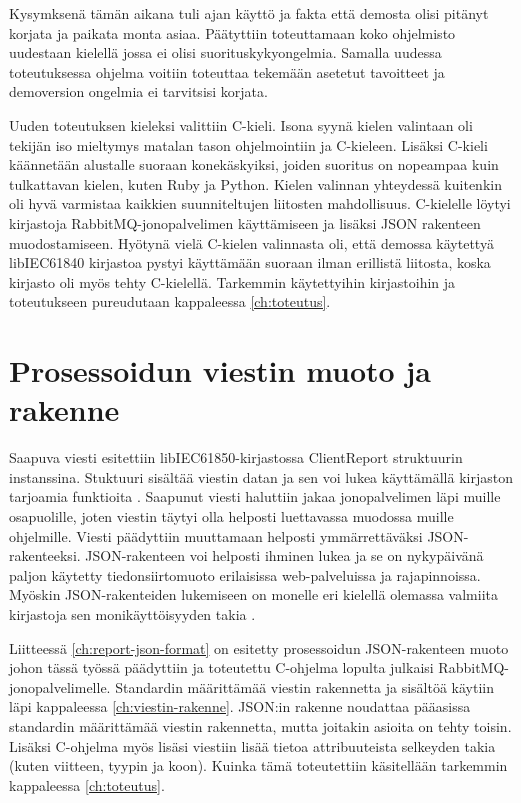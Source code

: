 Kysymksenä tämän aikana tuli ajan käyttö ja fakta että demosta olisi pitänyt korjata ja paikata monta asiaa. Päätyttiin toteuttamaan koko ohjelmisto uudestaan kielellä jossa ei olisi suorituskykyongelmia. Samalla uudessa toteutuksessa ohjelma voitiin toteuttaa tekemään asetetut tavoitteet ja demoversion ongelmia ei tarvitsisi korjata.

Uuden toteutuksen kieleksi valittiin C-kieli. Isona syynä kielen valintaan oli tekijän iso mieltymys matalan tason ohjelmointiin ja C-kieleen. Lisäksi C-kieli käännetään alustalle suoraan konekäskyiksi, joiden suoritus on nopeampaa kuin tulkattavan kielen, kuten Ruby ja Python. Kielen valinnan yhteydessä kuitenkin oli hyvä varmistaa kaikkien suunniteltujen liitosten mahdollisuus. C-kielelle löytyi kirjastoja RabbitMQ-jonopalvelimen käyttämiseen ja lisäksi JSON rakenteen muodostamiseen. Hyötynä vielä C-kielen valinnasta oli, että demossa käytettyä libIEC61840 kirjastoa pystyi käyttämään suoraan ilman erillistä liitosta, koska kirjasto oli myös tehty C-kielellä. Tarkemmin käytettyihin kirjastoihin ja toteutukseen pureudutaan kappaleessa \ref{ch:toteutus}.


\section{Prosessoidun viestin muoto ja rakenne}
Saapuva viesti esitettiin libIEC61850-kirjastossa ClientReport struktuurin instanssina. Stuktuuri sisältää viestin datan ja sen voi lukea käyttämällä kirjaston tarjoamia funktioita \cite{libIEC61850-doc}. Saapunut viesti haluttiin jakaa jonopalvelimen läpi muille osapuolille, joten viestin täytyi olla helposti luettavassa muodossa muille ohjelmille. Viesti päädyttiin muuttamaan helposti ymmärrettäväksi JSON-rakenteeksi. JSON-rakenteen voi helposti ihminen lukea ja se on nykypäivänä paljon käytetty tiedonsiirtomuoto erilaisissa web-palveluissa ja rajapinnoissa. Myöskin JSON-rakenteiden lukemiseen on monelle eri kielellä olemassa valmiita kirjastoja sen monikäyttöisyyden takia \cite{Patrizio2016}.

Liitteessä \ref{ch:report-json-format} on esitetty prosessoidun JSON-rakenteen muoto johon tässä työssä päädyttiin ja toteutettu C-ohjelma lopulta julkaisi RabbitMQ-jonopalvelimelle. Standardin määrittämää viestin rakennetta ja sisältöä käytiin läpi kappaleessa \ref{ch:viestin-rakenne}. JSON:in rakenne noudattaa pääasissa standardin määrittämää viestin rakennetta, mutta joitakin asioita on tehty toisin. Lisäksi C-ohjelma myös lisäsi viestiin lisää tietoa attribuuteista selkeyden takia (kuten viitteen, tyypin ja koon). Kuinka tämä toteutettiin käsitellään tarkemmin kappaleessa \ref{ch:toteutus}.

